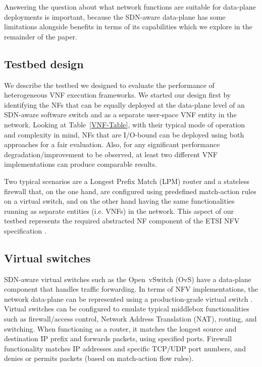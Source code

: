\documentclass[conference]{IEEEtran}
\begin{document}
 Answering the question about what network functions are suitable for data-plane deployments is important, because the SDN-aware data-plane has some limitations alongside benefits in terms of its capabilities which we explore in the remainder of the paper.
\subsection{Testbed design}
\label{design}

We describe the testbed we designed to evaluate the performance of heterogeneous VNF execution frameworks.
We started our design first by identifying the NFs that can be equally deployed at the data-plane level of an SDN-aware software switch and as a separate user-space VNF entity in the network. Looking at Table~\ref{VNF-Table}, with their typical mode of operation and complexity in mind, NFs that are I/O-bound can be deployed using both approaches for a fair evaluation. Also, for any significant performance degradation/improvement to be observed, at least two different VNF implementations can produce comparable results. %

Two typical scenarios are a Longest Prefix Match (LPM) router and a stateless firewall that, on the one hand, are configured using predefined match-action rules on a virtual switch, and on the other hand having the same functionalities running as separate entities (i.e. VNFs) in the network. This aspect of our testbed represents the required abstracted NF component of the ETSI NFV specification \cite{asquini2021etsi}.

\subsection{Virtual switches}
SDN-aware virtual switches such as the Open~vSwitch (OvS) have a data-plane component that handles traffic forwarding. In terms of NFV implementations, the network data-plane can be represented using a production-grade virtual switch \cite{tu2021revisiting}. Virtual switches can be configured to emulate typical middlebox functionalities such as firewall/access control, Network Address Translation (NAT), routing, and switching. When functioning as a router, it matches the longest source and destination IP prefix and forwards packets, using specified ports. Firewall functionality matches IP addresses and specific TCP/UDP port numbers, and denies or permits packets (based on match-action flow rules).
\end{document}
